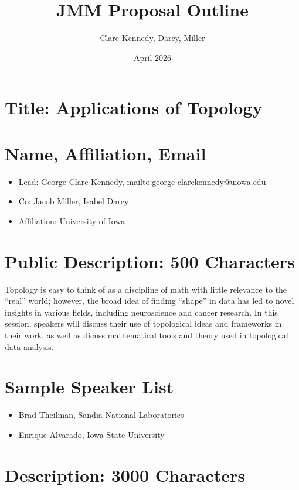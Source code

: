 \documentclass{article}
\title{JMM Proposal Outline}
\author{Clare Kennedy, Darcy, Miller}
\date{April 2026}
\begin{document}
\maketitle

\section{Title: Applications of Topology}

\section{Name, Affiliation, Email}

\begin{itemize}
    \item Lead: George Clare Kennedy, \url{mailto:george-clarekennedy@uiowa.edu}
    \item Co: Jacob Miller, Isabel Darcy
    \item Affiliation: University of Iowa
\end{itemize}

\section{Public Description: 500 Characters}

Topology is easy to think of as a discipline of math with little relevance to the ``real'' world; 
however, the broad idea of finding ``shape'' in data has led to novel insights in various fields, including neuroscience and cancer research. 
In this session, speakers will discuss their use of topological ideas and frameworks in their work, 
as well as dicuss mathematical tools and theory used in topological data analysis.

\section{Sample Speaker List}

\begin{itemize}
    \item Brad Theilman, Sandia National Laboratories
    \item Enrique Alvarado, Iowa State University
\end{itemize}

\section{Description: 3000 Characters}
\end{document}
